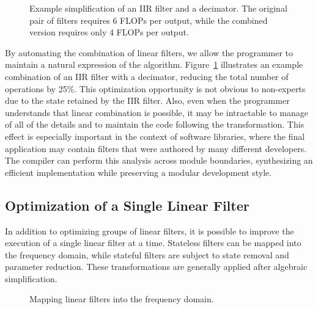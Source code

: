 \begin{figure}[t]
\centering
{}
\caption[Example simplification of an IIR filter and a decimator.]{Example 
simplification of an IIR filter and a decimator.  The original pair of
filters requires 6 FLOPs per output, while the combined version
requires only 4 FLOPs per output.\protect\label{fig:combination-example}}
\end{figure}

By automating the combination of linear filters, we allow the
programmer to maintain a natural expression of the algorithm.
Figure~\ref{fig:combination-example} illustrates an example
combination of an IIR filter with a decimator, reducing the total
number of operations by 25\%.  This optimization opportunity is not
obvious to non-experts due to the state retained by the IIR filter.
Also, even when the programmer understands that linear combination is
possible, it may be intractable to manage of all of the details and to
maintain the code following the transformation.  This effect is
especially important in the context of software libraries, where the
final application may contain filters that were authored by many
different developers.  The compiler can perform this analysis across
module boundaries, synthesizing an efficient implementation while
preserving a modular development style.

\subsection*{Optimization of a Single Linear Filter}

In addition to optimizing groups of linear filters, it is possible to
improve the execution of a single linear filter at a time.  Stateless
filters can be mapped into the frequency domain, while stateful
filters are subject to state removal and parameter reduction.  These
transformations are generally applied after algebraic simplification.

\begin{figure}[t]
\centering
{}
\caption{Mapping linear filters into the frequency domain.\protect\label{fig:freq}}
\end{figure}

